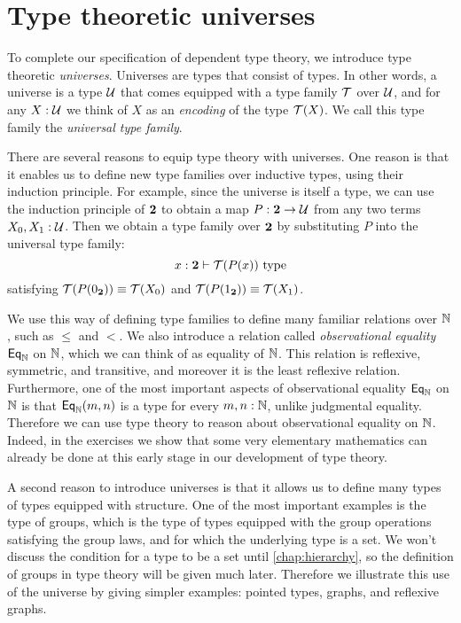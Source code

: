 \section{Type theoretic universes}

To complete our specification of dependent type theory, we introduce type theoretic \emph{universes}. Universes are types that consist of types. In other words, a universe is a type $\mathcal{U}$ that comes equipped with a type family $\mathcal{T}$ over $\mathcal{U}$, and for any $X:\mathcal{U}$ we think of $X$ as an \emph{encoding} of the type $\mathcal{T}(X)$. We call this type family the \emph{universal type family}.

There are several reasons to equip type theory with universes. One reason is that it enables us to define new type families over inductive types, using their induction principle. For example, since the universe is itself a type, we can use the induction principle of $\mathbf{2}$ to obtain a map $P:\mathbf{2}\to\mathcal{U}$ from any two terms $X_0,X_1:\mathcal{U}$. Then we obtain a type family over $\mathbf{2}$ by substituting $P$ into the universal type family:
\begin{equation*}
  x:\mathbf{2}\vdash \mathcal{T}(P(x))~\mathrm{type}
\end{equation*}
satisfying $\mathcal{T}(P(0_\mathbf{2}))\equiv \mathcal{T}(X_0)$ and $\mathcal{T}(P(1_\mathbf{2}))\equiv \mathcal{T}(X_1)$.

We use this way of defining type families to define many familiar relations over ${\mathbb{N}}$, such as $\leq$ and $<$. We also introduce a relation called \emph{observational equality} $\mathsf{Eq}_{\mathbb{N}}$ on ${\mathbb{N}}$, which we can think of as equality of ${\mathbb{N}}$. This relation is reflexive, symmetric, and transitive, and moreover it is the least reflexive relation. Furthermore, one of the most important aspects of observational equality $\mathsf{Eq}_{\mathbb{N}}$ on ${\mathbb{N}}$ is that $\mathsf{Eq}_{\mathbb{N}}(m,n)$ is a type for every $m,n:{\mathbb{N}}$, unlike judgmental equality. Therefore we can use type theory to reason about observational equality on ${\mathbb{N}}$. Indeed, in the exercises we show that some very elementary mathematics can already be done at this early stage in our development of type theory.

A second reason to introduce universes is that it allows us to define many types of types equipped with structure. One of the most important examples is the type of groups, which is the type of types equipped with the group operations satisfying the group laws, and for which the underlying type is a set. We won't discuss the condition for a type to be a set until \cref{chap:hierarchy}, so the definition of groups in type theory will be given much later. Therefore we illustrate this use of the universe by giving simpler examples: pointed types, graphs, and reflexive graphs.

